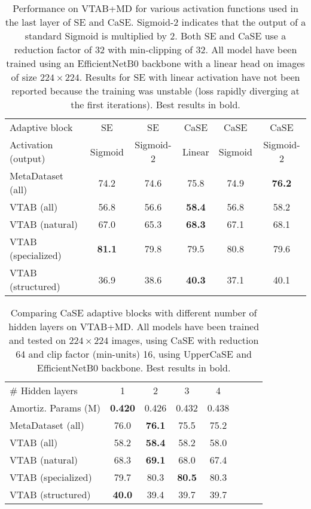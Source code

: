 \documentclass{article}
\begin{document}
\begin{table}[H]
\caption{Performance on VTAB+MD for various activation functions used in the last layer of SE and CaSE. Sigmoid-2 indicates that the output of a standard Sigmoid is multiplied by 2. Both SE and CaSE use a reduction factor of 32 with min-clipping of 32. All model have been trained using an EfficientNetB0 backbone with a linear head on images of size $224 \times 224$. Results for SE with linear activation have not been reported because the training was unstable (loss rapidly diverging at the first iterations). Best results in bold.}
\vskip 0.15in
\begin{center}
\begin{tabular}{lccccc}
\toprule
Adaptive block & SE & SE & CaSE & CaSE & CaSE \\
Activation (output) & Sigmoid & Sigmoid-2 & Linear & Sigmoid & Sigmoid-2 \\
\midrule
MetaDataset (all) & 74.2 & 74.6 & 75.8 & 74.9 & \textbf{76.2}\\
VTAB (all) & 56.8 & 56.6 & \textbf{58.4} & 56.8 & 58.2\\
VTAB (natural) & 67.0 & 65.3 & \textbf{68.3} & 67.1 & 68.1\\
VTAB (specialized) & \textbf{81.1} & 79.8 & 79.5 & 80.8 & 79.6\\
VTAB (structured) & 36.9 & 38.6 & \textbf{40.3} & 37.1 & 40.1\\
\bottomrule
\end{tabular}
\label{tab:ablation_activation_functions}
\end{center}
\vskip -0.1in
\end{table}

\begin{table}[H]
\caption{Comparing CaSE adaptive blocks with different number of hidden layers on VTAB+MD. All models have been trained and tested on $224 \times 224$ images, using CaSE with reduction 64 and clip factor (min-units) 16, using UpperCaSE and EfficientNetB0 backbone. Best results in bold.}
\vskip 0.15in
\begin{center}
\begin{tabular}{lccccccc}
\toprule
\# Hidden layers & 1 & 2 & 3 & 4\\
Amortiz. Params (M) & \textbf{0.420} & 0.426 & 0.432 & 0.438\\
\midrule
MetaDataset (all) & 76.0 & \textbf{76.1} & 75.5  & 75.2\\
VTAB (all) & 58.2 & \textbf{58.4} & 58.2 & 58.0\\
VTAB (natural) & 68.3 & \textbf{69.1} & 68.0  & 67.4\\
VTAB (specialized) & 79.7 & 80.3 & \textbf{80.5}  & 80.3 \\
VTAB (structured) & \textbf{40.0} & 39.4 & 39.7  & 39.7\\
\bottomrule
\end{tabular}
\label{tab:ablation_hidden_layers}
\end{center}
\vskip -0.1in
\end{table}
\end{document}
